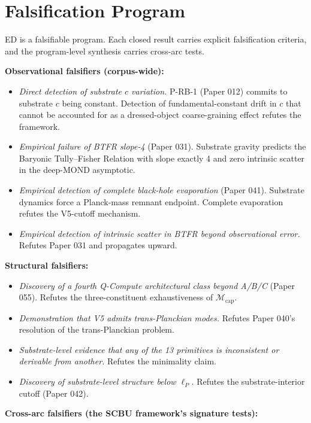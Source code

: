 \documentclass[11pt,a4paper]{article}
\begin{document}
\section{Falsification Program}

ED is a falsifiable program. Each closed result carries explicit falsification criteria, and the program-level synthesis carries cross-arc tests.

\textbf{Observational falsifiers (corpus-wide):}

\begin{itemize}[noitemsep]
\item \emph{Direct detection of substrate $c$ variation.} P-RB-1 (Paper 012) commits to substrate $c$ being constant. Detection of fundamental-constant drift in $c$ that cannot be accounted for as a dressed-object coarse-graining effect refutes the framework.
\item \emph{Empirical failure of BTFR slope-4} (Paper 031). Substrate gravity predicts the Baryonic Tully--Fisher Relation with slope exactly 4 and zero intrinsic scatter in the deep-MOND asymptotic.
\item \emph{Empirical detection of complete black-hole evaporation} (Paper 041). Substrate dynamics force a Planck-mass remnant endpoint. Complete evaporation refutes the V5-cutoff mechanism.
\item \emph{Empirical detection of intrinsic scatter in BTFR beyond observational error.} Refutes Paper 031 and propagates upward.
\end{itemize}

\textbf{Structural falsifiers:}

\begin{itemize}[noitemsep]
\item \emph{Discovery of a fourth Q-Compute architectural class beyond A/B/C} (Paper 055). Refutes the three-constituent exhaustiveness of $\mathcal{M}_\mathrm{cap}$.
\item \emph{Demonstration that V5 admits trans-Planckian modes.} Refutes Paper 040's resolution of the trans-Planckian problem.
\item \emph{Substrate-level evidence that any of the 13 primitives is inconsistent or derivable from another.} Refutes the minimality claim.
\item \emph{Discovery of substrate-level structure below $\ell_P$.} Refutes the substrate-interior cutoff (Paper 042).
\end{itemize}

\textbf{Cross-arc falsifiers (the SCBU framework's signature tests):}
\end{document}
